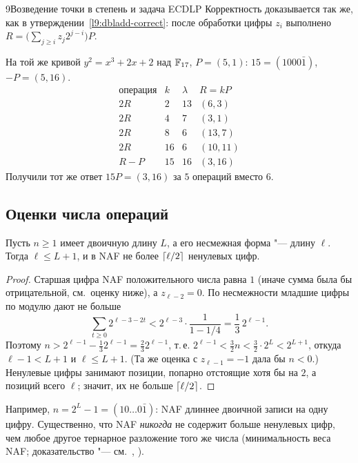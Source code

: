 \begin{lecture}{9}{Возведение точки в степень и задача ECDLP}
Корректность доказывается так же, как в утверждении~\ref{l9:dbladd-correct}: после обработки
цифры $z_i$ выполнено $R = \bigl(\sum_{j \ge i} z_j 2^{j - i}\bigr) P$.

\begin{example}\label{l9:ex-15P-naf}
На той же кривой $y^2 = x^3 + 2x + 2$ над $\mathbb{F}_{17}$, $P = (5, 1)$: $15 = (1000\bar 1)$,
$-P = (5, 16)$.
\[
\begin{array}{l|r|r|c}
  \text{операция} & k & \lambda & R = kP \\ \hline
  2R    & 2  & 13 & (6, 3)   \\
  2R    & 4  & 7  & (3, 1)   \\
  2R    & 8  & 6  & (13, 7)  \\
  2R    & 16 & 6  & (10, 11) \\
  R - P & 15 & 16 & (3, 16)
\end{array}
\]
Получили тот же ответ $15P = (3, 16)$ за $5$ операций вместо $6$.
\end{example}


\subsection{Оценки числа операций}

\begin{lemma}\label{l9:naf-len}
Пусть $n \ge 1$ имеет двоичную длину $L$, а его несмежная форма "--- длину $\ell$. Тогда
$\ell \le L + 1$, и в NAF не более $\lceil\ell/2\rceil$ ненулевых цифр.
\end{lemma}

\begin{proof}
Старшая цифра NAF положительного числа равна $1$ (иначе сумма была бы отрицательной, см.\
оценку ниже), а $z_{\ell-2} = 0$. По несмежности младшие цифры по модулю дают не больше
\[
  \sum_{t \ge 0} 2^{\ell - 3 - 2t} < 2^{\ell - 3} \cdot \frac{1}{1 - 1/4} = \frac13 \, 2^{\ell-1}.
\]
Поэтому $n > 2^{\ell-1} - \frac13 2^{\ell-1} = \frac23 2^{\ell-1}$, т.\,е.
$2^{\ell-1} < \frac32 n < \frac32 \cdot 2^L < 2^{L+1}$, откуда $\ell - 1 < L + 1$ и $\ell \le L + 1$.
(Та же оценка с $z_{\ell-1} = -1$ дала бы $n < 0$.) Ненулевые цифры занимают позиции, попарно
отстоящие хотя бы на $2$, а позиций всего $\ell$; значит, их не больше $\lceil\ell/2\rceil$.
\end{proof}

Например, $n = 2^L - 1 = (1 0 \dots 0 \bar 1)$: NAF длиннее двоичной записи на одну цифру.
Существенно, что NAF \emph{никогда} не содержит больше ненулевых цифр, чем любое другое тернарное
разложение того же числа (минимальность веса NAF; доказательство "--- см.~\cite[разд.~14.7]{hac},
\cite[гл.~11]{galbraith}).


\end{lecture}
